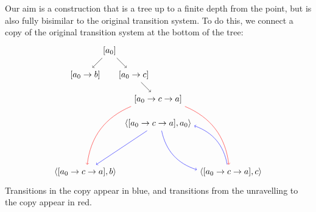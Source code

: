 \documentclass{article}
\theoremstyle{plain}
\theoremstyle{definition}
\theoremstyle{remark}
\numberwithin{theorem}{section}
\newcommand{\lt}{\langle}
\newcommand{\rt}{\rangle}
\begin{document}
Our aim is a construction that is a tree up to a finite depth from the point, but is also fully bisimilar to the original transition system. To do this, we connect a copy of the original transition system at the bottom of the tree:
\begin{equation*}
    \begin{tikzpicture}
    \path 
    node (a) {$[a_0]$} +(-1,-1) 
    node (b) {$[a_0 \rightarrow b]$} ++(1,-1) 
    node (c) {$[a_0 \rightarrow c]$} ++(1,-1) 
    node (a') {$[a_0 \rightarrow c \rightarrow a]$} ++(0,-1)
    node (a*) {$\lt [a_0 \rightarrow c \rightarrow a], a_0 \rt$  } +(-3,-2) 
    node (b*) {$\lt [a_0 \rightarrow c \rightarrow a], b \rt$} +(3,-2) 
    node (c*) {$\lt [a_0 \rightarrow c \rightarrow a], c \rt $};
    
    \path 
    (a) edge[->] (b) 
    (a) edge[->] (c)
    (c) edge[->] (a')
    (a*) edge[blue, ->] (b*) 
    (a*) edge[blue, ->, bend right] (c*)
    (c*) edge[blue, ->, bend right] (a*)
    (a') edge[red, ->, bend right] (b*)
    (a') edge[red, ->, bend left] (c*);
    \end{tikzpicture}
\end{equation*}
Transitions in the copy appear in blue, and transitions from the unravelling to the copy appear in red.
\end{document}
